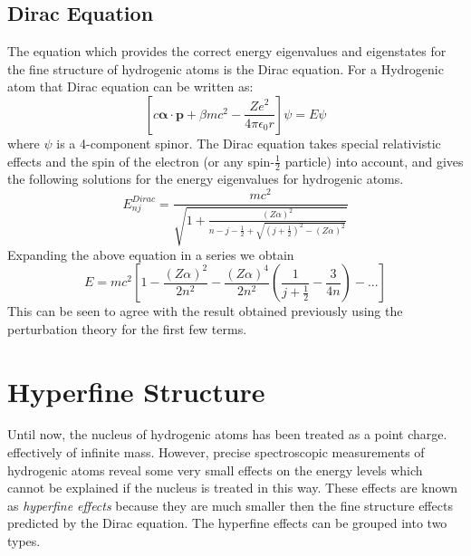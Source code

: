 \documentclass[a4paper]{IEEEtran}
\begin{document}
    \subsection{Dirac Equation}
    The equation which provides the correct energy eigenvalues and eigenstates for
    the fine structure of hydrogenic atoms is the Dirac equation. 
    For a Hydrogenic atom that Dirac equation can be written as:
    \begin{equation}
        \left[ c \mathbf{\alpha} \cdot \mathbf{p} + 
               \beta m c^2 - \frac{Ze^2}{4 \pi \epsilon_0 r}
        \right] \psi = E \psi
    \end{equation}
    where $\psi$ is a 4-component spinor.
    The Dirac equation takes special relativistic effects and the spin of the electron
    (or any spin-$\frac{1}{2}$ particle) into account, and gives the following solutions for the energy
    eigenvalues for hydrogenic atoms.
    \begin{equation}
        E_{nj}^{Dirac} = \frac{mc^2}
        {
            \sqrt
            { 
                1 + \frac{(Z \alpha)^2}
                {
                    n - j - \frac{1}{2} +
                    \sqrt
                    {
                        \left(j + \frac{1}{2}\right)^2 - (Z \alpha)^2
                    }
                }
            }
        }
    \end{equation}
    Expanding the above equation in a series we obtain
    \begin{equation}
        E = mc^2 \left[ 
            1 - \frac{(Z\alpha)^2}{2n^2} - \frac{(Z\alpha)^4}{2n^2}
                    \left(
                        \frac{1}{j + \frac{1}{2}} - \frac{3}{4n}
                    \right)
                        - ...
                 \right]
    \end{equation}
    This can be seen to agree with the result obtained previously using the perturbation
    theory for the first few terms.

\section{Hyperfine Structure}
    Until now, the nucleus of hydrogenic atoms has been treated as a point charge.
    effectively of infinite mass. However, precise spectroscopic measurements 
    of hydrogenic atoms reveal some very small effects on the energy levels which
    cannot be explained if the nucleus is treated in this way. These effects are
    known as \emph{hyperfine effects} because they are much smaller then the fine
    structure effects predicted by the Dirac equation. The hyperfine effects can
    be grouped into two types.
\end{document}
